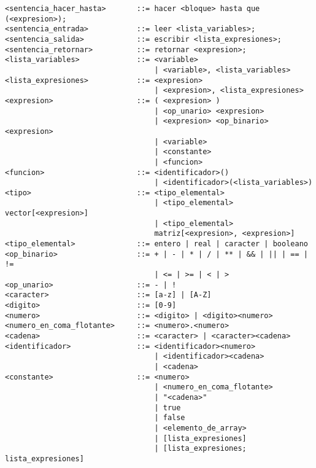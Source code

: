 \begin{verbatim}
<sentencia_hacer_hasta>       ::= hacer <bloque> hasta que (<expresion>);
<sentencia_entrada>           ::= leer <lista_variables>;
<sentencia_salida>            ::= escribir <lista_expresiones>;
<sentencia_retornar>          ::= retornar <expresion>;
<lista_variables>             ::= <variable>
                                  | <variable>, <lista_variables>
<lista_expresiones>           ::= <expresion>
                                  | <expresion>, <lista_expresiones>
<expresion>                   ::= ( <expresion> )
                                  | <op_unario> <expresion>
                                  | <expresion> <op_binario> <expresion>
                                  | <variable>
                                  | <constante>
                                  | <funcion>
<funcion>                     ::= <identificador>()
                                  | <identificador>(<lista_variables>)
<tipo>                        ::= <tipo_elemental>
                                  | <tipo_elemental> vector[<expresion>]
                                  | <tipo_elemental>
                                  matriz[<expresion>, <expresion>]
<tipo_elemental>              ::= entero | real | caracter | booleano
<op_binario>                  ::= + | - | * | / | ** | && | || | == | !=
                                  | <= | >= | < | >
<op_unario>                   ::= - | !
<caracter>                    ::= [a-z] | [A-Z]
<digito>                      ::= [0-9]
<numero>                      ::= <digito> | <digito><numero>
<numero_en_coma_flotante>     ::= <numero>.<numero>
<cadena>                      ::= <caracter> | <caracter><cadena>
<identificador>               ::= <identificador><numero>
                                  | <identificador><cadena>
                                  | <cadena>
<constante>                   ::= <numero>
                                  | <numero_en_coma_flotante>
                                  | "<cadena>"
                                  | true
                                  | false
                                  | <elemento_de_array>
                                  | [lista_expresiones]
                                  | [lista_expresiones; lista_expresiones]
\end{verbatim}


